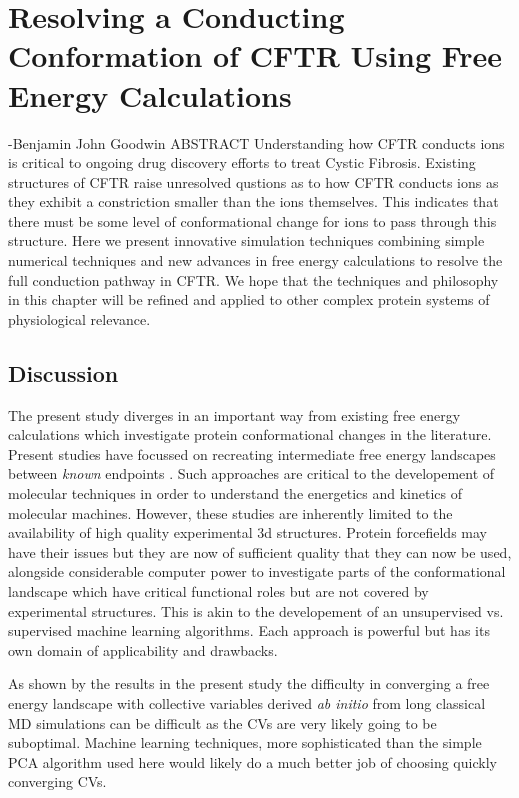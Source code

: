 \chapter{Resolving a Conducting Conformation of CFTR Using Free Energy Calculations}
\label{chap:opening}
 {-Benjamin John Goodwin}
ABSTRACT 
Understanding how CFTR conducts ions is critical to ongoing drug discovery efforts to treat Cystic Fibrosis. Existing structures of CFTR  raise unresolved qustions as to how CFTR conducts ions as they exhibit a constriction smaller than the ions themselves. This indicates that there must be some level of conformational change for ions to pass through this structure. Here we present innovative simulation techniques combining simple numerical techniques and new advances in free energy calculations to resolve the full conduction pathway in CFTR. We hope that the techniques and philosophy in this chapter will be refined and applied to other complex protein systems of physiological relevance. 
\newline

\section{Discussion}

The present study diverges in an important way from existing free energy calculations which investigate protein conformational changes in the literature. Present studies have focussed on recreating intermediate free energy landscapes between \textit{known} endpoints \cite{lev2020, bergh2021}. Such approaches are critical to the developement of molecular techniques in order to understand the energetics and kinetics of molecular machines. However, these studies are inherently limited to the availability of high quality experimental 3d structures. Protein forcefields may have their issues but they are now of sufficient quality that they can now be used, alongside considerable computer power to investigate parts of the conformational landscape which have critical functional roles but are not covered by experimental structures. This is akin to the developement of an unsupervised vs. supervised machine learning algorithms. Each approach is powerful but has its own domain of applicability and drawbacks. 

As shown by the results in the present study the difficulty in converging a free energy landscape with collective variables derived \textit {ab initio} from long classical MD simulations can be difficult as the CVs are very likely going to be suboptimal. Machine learning techniques, more sophisticated than the simple PCA algorithm used here would likely do a much better job of choosing quickly converging CVs. 
